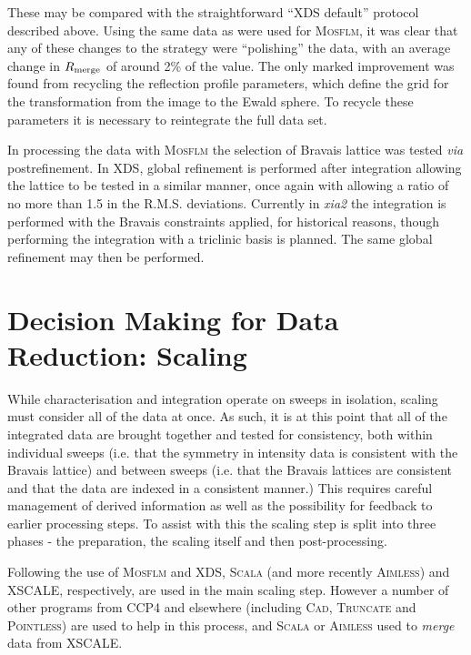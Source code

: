 \documentclass[preprint,pdf]{iucr}
\begin{document}
\noindent
These may be compared with the straightforward ``XDS default''
protocol described above. Using
the same data as were used for \textsc{Mosflm}, it was
clear that any of these changes to the strategy were ``polishing'' the
data, with an average change in $R_{\rm{merge}}$ of around 2\% of the
value. The only marked improvement was found from recycling the
reflection profile parameters, which define the grid for the
transformation from the image to the Ewald sphere.
To recycle these parameters it is necessary to reintegrate the full data set.

In processing the data with \textsc{Mosflm} the selection of Bravais lattice
was tested \emph{via} postrefinement. In XDS, global refinement is
performed after integration allowing the lattice to be tested in a
similar manner, once again with allowing a ratio of no more than 1.5
in the R.M.S. deviations. Currently in
\emph{xia2} the integration is performed with the Bravais constraints
applied, for historical reasons, though performing the integration
with a triclinic basis is planned. The same global refinement may then
be performed.

\section{Decision Making for Data Reduction: Scaling}

While characterisation and integration operate on sweeps in isolation,
scaling must consider all of the data at once. As such, it is at this
point that all of the integrated data are brought together and tested
for consistency, both within individual sweeps (i.e. that the symmetry
in intensity data is consistent with the Bravais lattice) and between
sweeps (i.e. that the Bravais lattices are consistent and that the
data are indexed in a consistent manner.) This requires careful
management of derived information as well as the possibility for feedback to
earlier processing steps. To assist with this the scaling step is
split into three phases - the preparation, the scaling itself and then
post-processing.

Following the use of \textsc{Mosflm} and XDS, \textsc{Scala} 
(and more recently \textsc{Aimless}) and
XSCALE, respectively, 
are used in the main scaling step. However a number of other
programs from CCP4 and elsewhere (including \textsc{Cad}, 
\textsc{Truncate} and
\textsc{Pointless}) are used to help in this process, and
\textsc{Scala} or \textsc{Aimless} used to \emph{merge} data from XSCALE.
\end{document}
